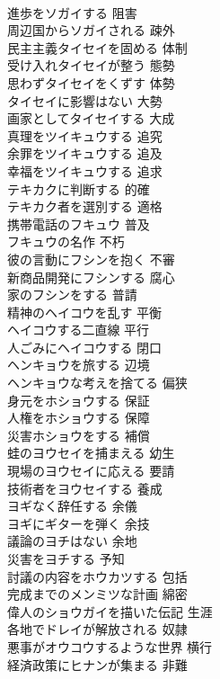\documentclass[8pt]{extreport}
\begin{document}
\begin{CJK}{UTF8}{min}
\\	進歩をソガイする	阻害
\\	周辺国からソガイされる	疎外
\\	民主主義タイセイを固める	体制
\\	受け入れタイセイが整う	態勢
\\	思わずタイセイをくずす	体勢
\\	タイセイに影響はない	大勢
\\	画家としてタイセイする	大成
\\	真理をツイキュウする	追究
\\	余罪をツイキュウする	追及
\\	幸福をツイキュウする	追求
\\	テキカクに判断する	的確
\\	テキカク者を選別する	適格
\\	携帯電話のフキュウ	普及
\\	フキュウの名作	不朽
\\	彼の言動にフシンを抱く	不審
\\	新商品開発にフシンする	腐心
\\	家のフシンをする	普請
\\	精神のヘイコウを乱す	平衡
\\	ヘイコウする二直線	平行
\\	人ごみにヘイコウする	閉口
\\	ヘンキョウを旅する	辺境
\\	ヘンキョウな考えを捨てる	偏狭
\\	身元をホショウする	保証
\\	人権をホショウする	保障
\\	災害ホショウをする	補償
\\	蛙のヨウセイを捕まえる	幼生
\\	現場のヨウセイに応える	要請
\\	技術者をヨウセイする	養成
\\	ヨギなく辞任する	余儀
\\	ヨギにギターを弾く	余技
\\	議論のヨチはない	余地
\\	災害をヨチする	予知
\\	討議の内容をホウカツする	包括
\\	完成までのメンミツな計画	綿密
\\	偉人のショウガイを描いた伝記	生涯
\\	各地でドレイが解放される	奴隷
\\	悪事がオウコウするような世界	横行
\\	経済政策にヒナンが集まる	非難

\end{CJK}
\end{document}
